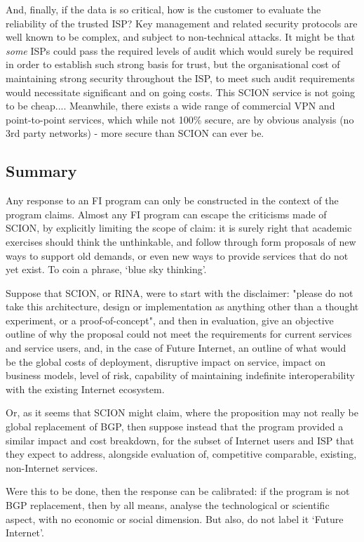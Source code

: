 And, finally, if the data is so critical, how is the customer to evaluate the reliability of the trusted ISP?  Key management and related security protocols are well known to be complex, and subject to non-technical attacks.  It might be that \emph{some} ISPs could pass the required levels of audit which would surely be required in order to establish such strong basis for trust, but the organisational cost of maintaining strong security throughout the ISP, to meet such audit requirements would necessitate significant and on going costs.  This SCION service is not going to be cheap....
Meanwhile, there exists a wide range of commercial VPN and point-to-point services, which while not 100\% secure, are by obvious analysis (no 3rd party networks) - more secure than SCION can ever be.

\subsection{Summary}

Any response to an FI program can only be constructed in the context of the program claims.  Almost any FI program can escape the criticisms made of SCION, by explicitly limiting the scope of claim: it is surely right that academic exercises should think the unthinkable, and follow through form proposals of new ways to support old demands, or even new ways to provide services that do not yet exist.  To coin a phrase, `blue sky thinking'.

Suppose that SCION, or RINA, were to start with the disclaimer: "please do not take this architecture, design or implementation as anything other than a thought experiment, or a proof-of-concept", and then in evaluation, give an objective outline of why the proposal could not meet the requirements for current services and service users, and, in the case of Future Internet, an outline of what would be the global costs of deployment, disruptive impact on service, impact on business models, level of risk, capability of maintaining indefinite interoperability  with the existing Internet ecosystem.

Or, as it seems that SCION might claim, where the proposition may not really be global replacement of BGP, then suppose  instead that the program provided a similar impact and cost breakdown, for the subset of Internet users and ISP that they expect to address, alongside evaluation of, competitive comparable, existing, non-Internet services.

Were this to be done, then the response can be calibrated: if the program is not BGP replacement, then by all means, analyse the technological or scientific aspect, with no economic or social dimension.
But also, do not label it `Future Internet'.


